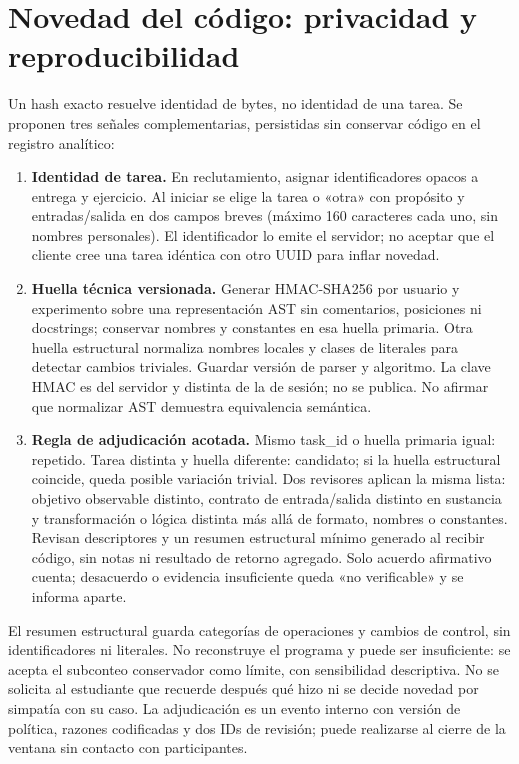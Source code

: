 \documentclass[11pt,a4paper]{report}
\begin{document}
\section{Novedad del código: privacidad y reproducibilidad}
Un hash exacto resuelve identidad de bytes, no identidad de una tarea. Se proponen tres señales complementarias, persistidas sin conservar código en el registro analítico:
\begin{enumerate}
\item \textbf{Identidad de tarea.} En reclutamiento, asignar identificadores opacos a entrega y ejercicio. Al iniciar se elige la tarea o «otra» con propósito y entradas/salida en dos campos breves (máximo 160 caracteres cada uno, sin nombres personales). El identificador lo emite el servidor; no aceptar que el cliente cree una tarea idéntica con otro UUID para inflar novedad.
\item \textbf{Huella técnica versionada.} Generar HMAC-SHA256 por usuario y experimento sobre una representación AST sin comentarios, posiciones ni docstrings; conservar nombres y constantes en esa huella primaria. Otra huella estructural normaliza nombres locales y clases de literales para detectar cambios triviales. Guardar versión de parser y algoritmo. La clave HMAC es del servidor y distinta de la de sesión; no se publica. No afirmar que normalizar AST demuestra equivalencia semántica.
\item \textbf{Regla de adjudicación acotada.} Mismo task\_id o huella primaria igual: repetido. Tarea distinta y huella diferente: candidato; si la huella estructural coincide, queda posible variación trivial. Dos revisores aplican la misma lista: objetivo observable distinto, contrato de entrada/salida distinto en sustancia y transformación o lógica distinta más allá de formato, nombres o constantes. Revisan descriptores y un resumen estructural mínimo generado al recibir código, sin notas ni resultado de retorno agregado. Solo acuerdo afirmativo cuenta; desacuerdo o evidencia insuficiente queda «no verificable» y se informa aparte.
\end{enumerate}
El resumen estructural guarda categorías de operaciones y cambios de control, sin identificadores ni literales. No reconstruye el programa y puede ser insuficiente: se acepta el subconteo conservador como límite, con sensibilidad descriptiva. No se solicita al estudiante que recuerde después qué hizo ni se decide novedad por simpatía con su caso. La adjudicación es un evento interno con versión de política, razones codificadas y dos IDs de revisión; puede realizarse al cierre de la ventana sin contacto con participantes.
\end{document}
